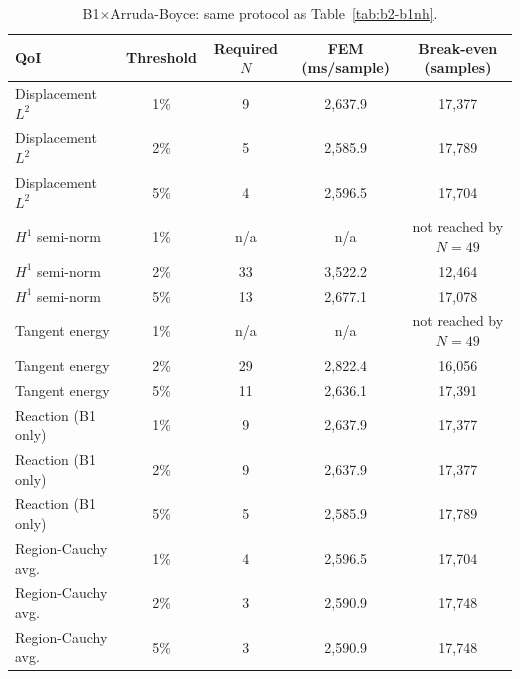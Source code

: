 \documentclass[final,5p,times]{elsarticle}
\begin{document}
\begin{table}[ht]
\centering
\caption{B1$\times$Arruda-Boyce: same protocol as Table~\ref{tab:b2-b1nh}.}
\label{tab:b2-b1ab}
\small
\begin{tabular}{lcccc}
\toprule
QoI & Threshold & Required $N$ & FEM (ms/sample) & Break-even (samples) \\
\midrule
Displacement $L^2$  & 1\% & 9   & 2{,}637.9 & 17{,}377 \\
Displacement $L^2$  & 2\% & 5   & 2{,}585.9 & 17{,}789 \\
Displacement $L^2$  & 5\% & 4   & 2{,}596.5 & 17{,}704 \\
$H^1$ semi-norm     & 1\% & n/a & n/a       & not reached by $N{=}49$ \\
$H^1$ semi-norm     & 2\% & 33  & 3{,}522.2 & 12{,}464 \\
$H^1$ semi-norm     & 5\% & 13  & 2{,}677.1 & 17{,}078 \\
Tangent energy      & 1\% & n/a & n/a       & not reached by $N{=}49$ \\
Tangent energy      & 2\% & 29  & 2{,}822.4 & 16{,}056 \\
Tangent energy      & 5\% & 11  & 2{,}636.1 & 17{,}391 \\
Reaction (B1 only)  & 1\% & 9   & 2{,}637.9 & 17{,}377 \\
Reaction (B1 only)  & 2\% & 9   & 2{,}637.9 & 17{,}377 \\
Reaction (B1 only)  & 5\% & 5   & 2{,}585.9 & 17{,}789 \\
Region-Cauchy avg.\ & 1\% & 4   & 2{,}596.5 & 17{,}704 \\
Region-Cauchy avg.\ & 2\% & 3   & 2{,}590.9 & 17{,}748 \\
Region-Cauchy avg.\ & 5\% & 3   & 2{,}590.9 & 17{,}748 \\
\bottomrule
\end{tabular}
\end{table}
\end{document}
